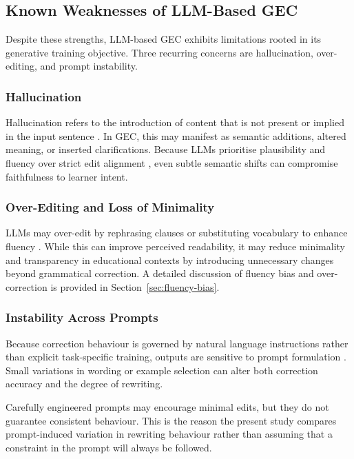 \subsection{Known Weaknesses of LLM-Based GEC}

Despite these strengths, LLM-based GEC exhibits limitations rooted in its generative training objective. Three recurring concerns are hallucination, over-editing, and prompt instability.

\subsubsection{Hallucination}

Hallucination refers to the introduction of content that is not present or implied in the input sentence \cite{maynez2020faithfulness}. In GEC, this may manifest as semantic additions, altered meaning, or inserted clarifications. Because LLMs prioritise plausibility and fluency over strict edit alignment \cite{NEURIPS2020_1457c0d6}, even subtle semantic shifts can compromise faithfulness to learner intent.

\subsubsection{Over-Editing and Loss of Minimality}

LLMs may over-edit by rephrasing clauses or substituting vocabulary to enhance fluency \cite{loem2023exploringeffectivenessgpt3grammatical}. While this can improve perceived readability, it may reduce minimality and transparency in educational contexts by introducing unnecessary changes beyond grammatical correction. A detailed discussion of fluency bias and over-correction is provided in Section~\ref{sec:fluency-bias}.

\subsubsection{Instability Across Prompts}

Because correction behaviour is governed by natural language instructions rather than explicit task-specific training, outputs are sensitive to prompt formulation \cite{liu2023pretrain}. Small variations in wording or example selection can alter both correction accuracy and the degree of rewriting.

Carefully engineered prompts may encourage minimal edits, but they do not guarantee consistent behaviour. This is the reason the present study compares prompt-induced variation in rewriting behaviour rather than assuming that a constraint in the prompt will always be followed.

